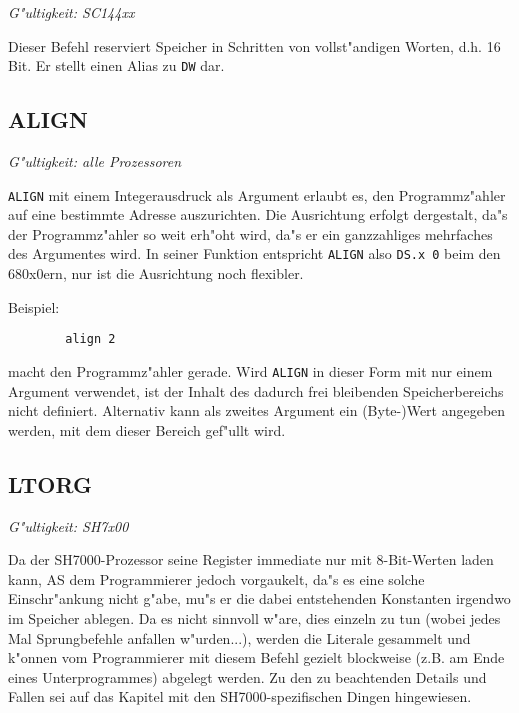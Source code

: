 \documentclass[12pt,a4paper,twoside]{report}
\makeatletter
\newcommand{\tty}[1]{{\tt #1}}
\newcommand{\ttindex}[1]{\index{#1@{\tt #1}}}
\makeatother
\begin{document}
{\em G"ultigkeit: SC144xx}

Dieser Befehl reserviert Speicher in Schritten von vollst"andigen Worten,
d.h. 16 Bit.  Er stellt einen Alias zu {\tt DW} dar.


\subsection{ALIGN}
\ttindex{ALIGN}

{\em G"ultigkeit: alle Prozessoren}

\tty{ALIGN} mit einem Integerausdruck als Argument erlaubt es, den
Programmz"ahler auf eine bestimmte Adresse auszurichten.  Die
Ausrichtung erfolgt dergestalt, da"s der Programmz"ahler so weit
erh"oht wird, da"s er ein ganzzahliges mehrfaches des Argumentes
wird.  In seiner Funktion entspricht \tty{ALIGN} also \tty{DS.x 0}
beim den 680x0ern, nur ist die Ausrichtung noch flexibler.
\par
Beispiel:
\begin{verbatim}
        align 2
\end{verbatim}
macht den Programmz"ahler gerade.  Wird \tty{ALIGN} in dieser Form mit nur
einem Argument verwendet, ist der Inhalt des dadurch frei bleibenden
Speicherbereichs nicht definiert.  Alternativ kann als zweites Argument ein
(Byte-)Wert angegeben werden, mit dem dieser Bereich gef"ullt wird.


\subsection{LTORG}
\ttindex{LTORG}

{\em G"ultigkeit: SH7x00}

Da der SH7000-Prozessor seine Register immediate nur mit 8-Bit-Werten
laden kann, AS dem Programmierer jedoch vorgaukelt, da"s es eine solche
Einschr"ankung nicht g"abe, mu"s er die dabei entstehenden Konstanten
irgendwo im Speicher ablegen.  Da es nicht sinnvoll w"are, dies einzeln
zu tun (wobei jedes Mal Sprungbefehle anfallen w"urden...), werden die
Literale gesammelt und k"onnen vom Programmierer mit diesem Befehl
gezielt blockweise (z.B. am Ende eines Unterprogrammes) abgelegt werden.
Zu den zu beachtenden Details und Fallen sei auf das Kapitel mit den
SH7000-spezifischen Dingen hingewiesen.
\end{document}

